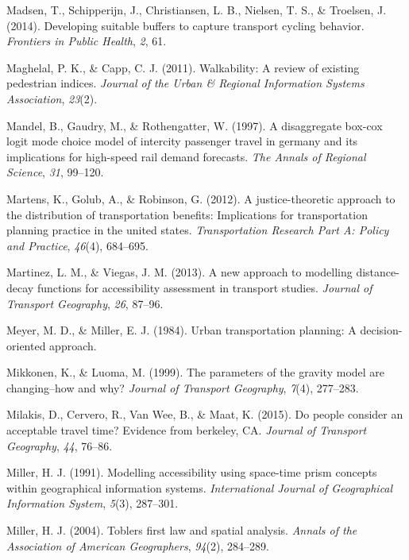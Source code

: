 \documentclass[
11pt, %
oneside, %
english, %
singlespacing, %
]{macthesis} %
\newlength{\cslhangindent}
\newenvironment{CSLReferences}[2] %
{\begin{list}{}{%
	\setlength{\itemindent}{0pt}
	\setlength{\leftmargin}{0pt}
	\setlength{\parsep}{0pt}
	\ifodd #1
	\setlength{\leftmargin}{\cslhangindent}
	\setlength{\itemindent}{-1\cslhangindent}
	\fi
	\setlength{\itemsep}{#2\baselineskip}}}
{\end{list}}
\begin{document}
\begin{CSLReferences}{1}{0}
Madsen, T., Schipperijn, J., Christiansen, L. B., Nielsen, T. S., \& Troelsen, J. (2014). Developing suitable buffers to capture transport cycling behavior. \emph{Frontiers in Public Health}, \emph{2}, 61.

Maghelal, P. K., \& Capp, C. J. (2011). Walkability: A review of existing pedestrian indices. \emph{Journal of the Urban \& Regional Information Systems Association}, \emph{23}(2).

Mandel, B., Gaudry, M., \& Rothengatter, W. (1997). A disaggregate box-cox logit mode choice model of intercity passenger travel in germany and its implications for high-speed rail demand forecasts. \emph{The Annals of Regional Science}, \emph{31}, 99--120.

Martens, K., Golub, A., \& Robinson, G. (2012). A justice-theoretic approach to the distribution of transportation benefits: Implications for transportation planning practice in the united states. \emph{Transportation Research Part A: Policy and Practice}, \emph{46}(4), 684--695.

Martinez, L. M., \& Viegas, J. M. (2013). A new approach to modelling distance-decay functions for accessibility assessment in transport studies. \emph{Journal of Transport Geography}, \emph{26}, 87--96.

Meyer, M. D., \& Miller, E. J. (1984). Urban transportation planning: A decision-oriented approach.

Mikkonen, K., \& Luoma, M. (1999). The parameters of the gravity model are changing--how and why? \emph{Journal of Transport Geography}, \emph{7}(4), 277--283.

Milakis, D., Cervero, R., Van Wee, B., \& Maat, K. (2015). Do people consider an acceptable travel time? Evidence from berkeley, CA. \emph{Journal of Transport Geography}, \emph{44}, 76--86.

Miller, H. J. (1991). Modelling accessibility using space-time prism concepts within geographical information systems. \emph{International Journal of Geographical Information System}, \emph{5}(3), 287--301.

Miller, H. J. (2004). Toblers first law and spatial analysis. \emph{Annals of the Association of American Geographers}, \emph{94}(2), 284--289.


\end{CSLReferences}
\end{document}
